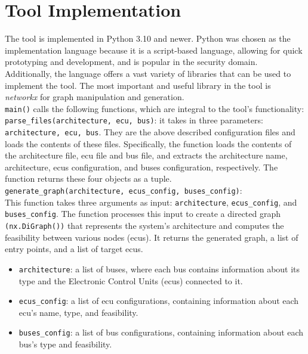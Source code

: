 \section{Tool Implementation}
\label{sec:implementation}

The tool is implemented in Python 3.10 and newer.
Python was chosen as the implementation language because it is a script-based language, allowing for quick prototyping and development,
and is popular in the security domain.
Additionally, the language offers a vast variety of libraries that can be used to implement the tool.
The most important and useful library in the tool is \textit{networkx} for graph manipulation and generation.\\

\texttt{main()} calls the following functions, which are integral to the tool's functionality:\\

\texttt{parse\_files(architecture, ecu, bus)}: it takes in three parameters: \texttt{architecture, ecu, bus}.
They are the above described configuration files and loads the contents of these files. 
Specifically, the function loads the contents of the architecture file, \acrshort{ecu} file and bus file, 
and extracts the architecture name, architecture, \acrshort{ecu}s configuration, and buses configuration, respectively. 
The function returns these four objects as a tuple.\\

\texttt{generate\_graph(architecture, ecus\_config, buses\_config)}:\\
This function takes three arguments as input: 
\texttt{architecture}, \texttt{ecus\_config}, and \texttt{buses\_config}. 
The function processes this input to create a directed graph \texttt{(nx.DiGraph())} 
that represents the system's architecture and computes the feasibility between various nodes (\acrshort{ecu}s). 
It returns the generated graph, a list of entry points, and a list of target \acrshort{ecu}s.
\begin{itemize}
    \item \texttt{architecture}: a list of buses, where each bus contains information about its type and the Electronic Control Units (\acrshort{ecu}s) connected to it.
    \item \texttt{ecus\_config}: a list of \acrshort{ecu} configurations, containing information about each \acrshort{ecu}'s name, type, and feasibility.
    \item \texttt{buses\_config}: a list of bus configurations, containing information about each bus's type and feasibility.  
\end{itemize}

